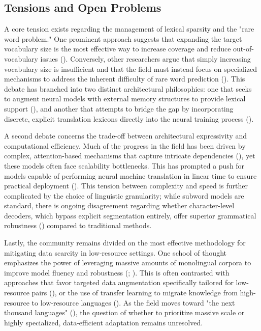 \documentclass[11pt]{article}
\begin{document}
\subsection{Tensions and Open Problems}

A core tension exists regarding the management of lexical sparsity and the "rare word problem." One prominent approach suggests that expanding the target vocabulary size is the most effective way to increase coverage and reduce out-of-vocabulary issues (\citep{1412.2007}). Conversely, other researchers argue that simply increasing vocabulary size is insufficient and that the field must instead focus on specialized mechanisms to address the inherent difficulty of rare word prediction (\citep{1410.8206}). This debate has branched into two distinct architectural philosophies: one that seeks to augment neural models with external memory structures to provide lexical support (\citep{1708.02005}), and another that attempts to bridge the gap by incorporating discrete, explicit translation lexicons directly into the neural training process (\citep{1606.02006}).

A second debate concerns the trade-off between architectural expressivity and computational efficiency. Much of the progress in the field has been driven by complex, attention-based mechanisms that capture intricate dependencies (\citep{1508.04025}), yet these models often face scalability bottlenecks. This has prompted a push for models capable of performing neural machine translation in linear time to ensure practical deployment (\citep{1610.10099}). This tension between complexity and speed is further complicated by the choice of linguistic granularity; while subword models are standard, there is ongoing disagreement regarding whether character-level decoders, which bypass explicit segmentation entirely, offer superior grammatical robustness (\citep{1603.06147}) compared to traditional methods.

Lastly, the community remains divided on the most effective methodology for mitigating data scarcity in low-resource settings. One school of thought emphasizes the power of leveraging massive amounts of monolingual corpora to improve model fluency and robustness (\citep{1511.06709}; \citep{1503.03535}). This is often contrasted with approaches that favor targeted data augmentation specifically tailored for low-resource pairs (\citep{1705.00440}), or the use of transfer learning to migrate knowledge from high-resource to low-resource languages (\citep{1604.02201}). As the field moves toward "the next thousand languages" (\citep{2205.03983}), the question of whether to prioritize massive scale or highly specialized, data-efficient adaptation remains unresolved.
\end{document}

